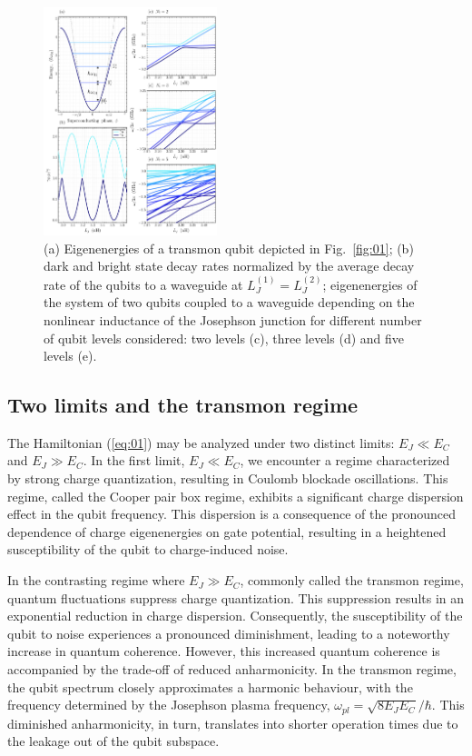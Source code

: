 \documentclass[lettersize,journal]{IEEEtran}
\begin{document}
\begin{figure}[h]
    \centering
    \includegraphics[width=0.45\textwidth]{fig_2}
    \caption{(a) Eigenenergies of a transmon qubit depicted in Fig.~\ref{fig:01}; (b) dark and bright state decay rates normalized by the average decay rate of the qubits to a waveguide at $L_J^{(1)} = L_J^{(2)}$; eigenenergies of the system of two qubits coupled to a waveguide depending on the nonlinear inductance of the Josephson junction for different number of qubit levels considered: two levels (c), three levels (d) and five levels (e).}
    \label{fig:02}
\end{figure}

\subsection{Two limits and the transmon regime}

The Hamiltonian (\ref{eq:01}) may be analyzed under two distinct limits: $E_J \ll E_C$ and $E_J \gg E_C$.
In the first limit, $E_J \ll E_C$, we encounter a regime characterized by strong charge quantization, resulting in Coulomb blockade oscillations. 
This regime, called the Cooper pair box regime, exhibits a significant charge dispersion effect in the qubit frequency. This dispersion is a consequence of the pronounced dependence of charge eigenenergies on gate potential, resulting in a heightened susceptibility of the qubit to charge-induced noise.

In the contrasting regime where $E_J \gg E_C$, commonly called the transmon regime, quantum fluctuations suppress charge quantization. 
This suppression results in an exponential reduction in charge dispersion. Consequently, the susceptibility of the qubit to noise experiences a pronounced diminishment, leading to a noteworthy increase in quantum coherence.
However, this increased quantum coherence is accompanied by the trade-off of reduced anharmonicity. 
In the transmon regime, the qubit spectrum closely approximates a harmonic behaviour, with the frequency determined by the Josephson plasma frequency, $\omega_{pl} = \sqrt{8 E_J E_C} / \hbar$.
This diminished anharmonicity, in turn, translates into shorter operation times due to the leakage out of the qubit subspace.
\end{document}
